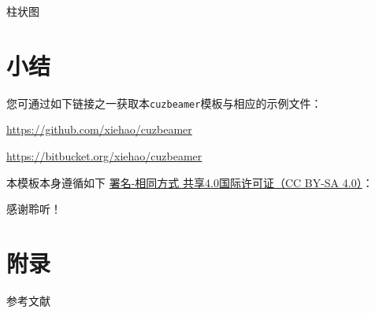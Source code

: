 \documentclass[colortheme=light,algorithm,pgfplots]{njubeamer}
\begin{document}
    \begin{frame}
        \begin{block}{柱状图}
            \begin{figure}
            \end{figure}
        \end{block}
    \end{frame}

    \section{小结}

    \begin{frame}{}
        \begin{leftbar}
            您可通过如下链接之一获取本\texttt{cuzbeamer}模板与相应的示例文件：
            \par
            \begin{center}
                \href{https://github.com/xiehao/cuzbeamer}{https://github.com/xiehao/cuzbeamer}\par
                \href{https://bitbucket.org/xiehao/cuzbeamer}{https://bitbucket.org/xiehao/cuzbeamer}
            \end{center}
            本模板本身遵循如下
            \href{http://creativecommons.org/licenses/by-sa/4.0/}{署名-相同方式
            共享4.0国际许可证（CC BY-SA 4.0）}：
            \begin{center}
                \ccbysa
            \end{center}
        \end{leftbar}
    \end{frame}

    \begin{standout}[]
        感谢聆听！
    \end{standout}

    \appendix

    \section{附录}

    \begin{frame}[allowframebreaks]{参考文献}
        
        
    \end{frame}
\end{document}
